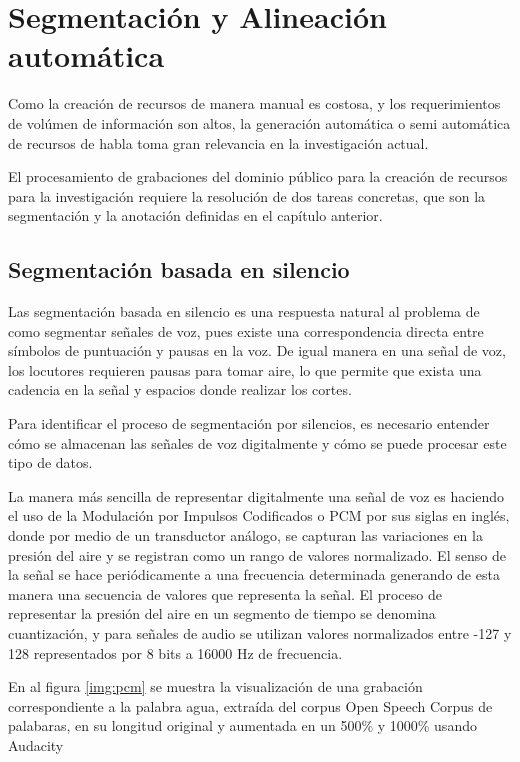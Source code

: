\chapter{Segmentación y Alineación automática}

Como la creación de recursos de manera manual es costosa, y los requerimientos de volúmen de información son altos, la generación automática o semi automática de recursos de habla toma gran relevancia en la investigación actual.

El procesamiento de grabaciones del dominio público para la creación de recursos para la investigación requiere la resolución de dos tareas concretas, que son la segmentación y la anotación definidas en el capítulo anterior.

\section{Segmentación basada en silencio}

Las segmentación basada en silencio es una respuesta natural al problema de como segmentar señales de voz, pues existe una correspondencia directa entre símbolos de puntuación y pausas en la voz. De igual manera en una señal de voz, los locutores requieren pausas para tomar aire, lo que permite que exista una cadencia en la señal y espacios donde realizar los cortes.

Para identificar el proceso de segmentación por silencios, es necesario entender cómo se almacenan las señales de voz digitalmente y cómo se puede procesar este tipo de datos.

La manera m\'as sencilla de representar digitalmente una señal de voz es haciendo el uso de la Modulación por Impulsos Codificados o PCM por sus siglas en inglés, donde por medio de un transductor análogo, se capturan las variaciones en la presión del aire y se registran como un rango de valores normalizado. El senso de la señal se hace periódicamente a una frecuencia determinada generando de esta manera una secuencia de valores que representa la señal. El proceso de representar la presión del aire en un segmento de tiempo se denomina cuantización, y para señales de audio se utilizan valores normalizados entre -127 y 128 representados por 8 bits a 16000 Hz de frecuencia.

En al figura \ref{img:pcm} se muestra la visualización de una grabación correspondiente a la palabra agua, extraída del corpus Open Speech Corpus de palabaras, en su longitud original y aumentada en un 500\% y 1000\% usando Audacity \cite{audacity}

